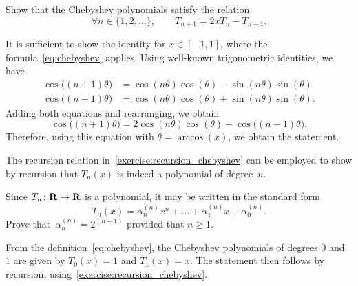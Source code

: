 \begin{exercise}
    \label{exercise:recursion_chebyshev}
    Show that the Chebyshev polynomials satisfy the relation
    \begin{equation}
        \label{eq:recursion_chebyshev}
        \forall n \in \{1, 2, \dotsc\},
        \qquad
        T_{n+1} = 2 x T_{n} - T_{n-1}.
    \end{equation}
\end{exercise}
\begin{solution}
    It is sufficient to show the identity for $x \in [-1, 1]$,
    where the formula~\eqref{eq:chebyshev} applies.
    Using well-known trigonometric identities,
    we have
    \begin{align*}
        \cos\bigl((n+1) \theta\bigr) &= \cos(n \theta) \cos(\theta) - \sin(n \theta) \sin (\theta)  \\
        \cos\bigl((n-1) \theta\bigr) &= \cos(n \theta) \cos(\theta) + \sin(n \theta) \sin (\theta).
    \end{align*}
    Adding both equations and rearranging, we obtain
    \[
        \cos\bigl((n+1) \theta\bigr) = 2 \cos(n \theta) \cos (\theta) - \cos\bigl((n-1) \theta\bigr).
    \]
    Therefore, using this equation with $\theta = \arccos(x)$,
    we obtain the statement.
\end{solution}

\begin{remark}
    The recursion relation in~\cref{exercise:recursion_chebyshev}
    can be employed to show by recursion that $T_n(x)$ is indeed a polynomial of degree~$n$.
\end{remark}

\begin{exercise}
    \label{exercise:chebyshev_leading_coefficient}
    Since $T_n\colon \mathbf R \to \mathbf R$ is a polynomial,
    it may be written in the standard form
    \[
        T_n(x) = \alpha^{(n)}_n x^n + \dotsc + \alpha^{(n)}_1 x + \alpha^{(n)}_0.
    \]
    Prove that~$\alpha^{(n)}_n = 2^{(n-1)}$ provided that $n \geq 1$.
\end{exercise}
\begin{solution}
    From the definition~\eqref{eq:chebyshev},
    the Chebyshev polynomials of degrees 0 and 1 are given by $T_0(x) = 1$ and $T_1(x) = x$.
    The statement then follows by recursion, using~\cref{exercise:recursion_chebyshev}.
\end{solution}

